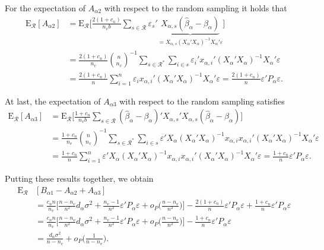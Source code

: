 \documentclass[Research_Module_ES.tex]{subfiles}
\begin{document}
For the expectation of $A_{\alpha2}$ with respect to the random sampling it holds that
\begin{align*}
\mathrm{E}_\mathcal{R}[A_{\alpha2}] 
&=\mathrm{E}_\mathcal{R}\biggl[ \frac{2(1+c_n)}{n_vb}\sum_{s\in \mathcal{R}}\varepsilon_s'\underbrace{X_{\alpha,s}(\hat{\beta}_\alpha-\beta_\alpha)}_{=X_{\alpha,s}(X_\alpha'X_\alpha)^{-1}X_\alpha'\varepsilon}\biggr]\\
&= \frac{2(1+c_n)}{n_v}\binom{n}{n_v}^{-1}\sum_{s\in\mathcal{R}^\ast}\sum_{i\in s}\varepsilon_i'x_{\alpha,i}'(X_\alpha'X_\alpha)^{-1}X_\alpha'\varepsilon\\
&= \frac{2(1+c_n)}{n} \sum_{i=1}^n\varepsilon_ix_{\alpha,i}'(X_\alpha'X_\alpha)^{-1}X_\alpha'\varepsilon
= \frac{2(1+c_n)}{n} \varepsilon'P_\alpha\varepsilon.
\end{align*}

At last, the expectation of $A_{\alpha3}$ with respect to the random sampling satisfies
\begin{align*}
\mathrm{E}_\mathcal{R}[A_{\alpha3}] 
&=\mathrm{E}_\mathcal{R}\biggl[ \frac{1+c_n}{n_vb}\sum_{s\in \mathcal{R}}(\hat{\beta}_\alpha-\beta_\alpha)'X_{\alpha,s}'X_{\alpha,s}(\hat{\beta}_\alpha-\beta_\alpha)\biggr]\\
&= \frac{1+c_n}{n_v}\binom{n}{n_v}^{-1}\sum_{s\in\mathcal{R}^\ast}\sum_{i\in s}\varepsilon'X_{\alpha}(X_{\alpha}'X_{\alpha})^{-1}x_{\alpha,i}x_{\alpha,i}'(X_{\alpha}'X_{\alpha})^{-1}X_{\alpha}'\varepsilon\\
&= \frac{1+c_n}{n}\sum_{i=1}^n\varepsilon'X_{\alpha}(X_{\alpha}'X_{\alpha})^{-1}x_{\alpha,i}x_{\alpha,i}'(X_{\alpha}'X_{\alpha})^{-1}X_{\alpha}'\varepsilon
= \frac{1+c_n}{n}\varepsilon'P_\alpha\varepsilon.
\end{align*}

Putting these results together, we obtain
\begin{align*}
\mathrm{E}_\mathcal{R}&[B_{\alpha1}-A_{\alpha2}+A_{\alpha3}]\\
&= \frac{c_nn}{n_v}\biggl[\frac{n-n_v}{n^2}d_\alpha\sigma^2
+\frac{n_v-1}{n^2}\varepsilon'P_\alpha\varepsilon + o_P\biggl(\frac{n-n_v}{n^2}\biggr)\biggr]
-\frac{2(1+c_n)}{n} \varepsilon'P_\alpha\varepsilon
+\frac{1+c_n}{n}\varepsilon'P_\alpha\varepsilon\\
&= \frac{c_nn}{n_v}\biggl[\frac{n-n_v}{n^2}d_\alpha\sigma^2
+\frac{n_v-1}{n^2}\varepsilon'P_\alpha\varepsilon + o_P\biggl(\frac{n-n_v}{n^2}\biggr)\biggr]
-\frac{1+c_n}{n} \varepsilon'P_\alpha\varepsilon\\
&=\frac{d_\alpha\sigma^2}{n-n_v}+ o_P\biggl(\frac{1}{n-n_v}\biggr).
\end{align*}
\end{document}
